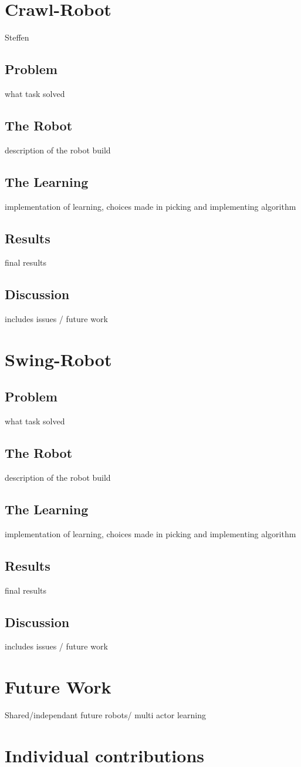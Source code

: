 \documentclass[11pt, a4paper]{article}
\begin{document}
\section{Crawl-Robot}
Steffen
\subsection{Problem}
what task solved
\subsection{The Robot}
description of the robot build
\subsection{The Learning}
implementation of learning, choices made in picking and implementing algorithm
\subsection{Results}
final results
\subsection{Discussion}
includes issues / future work

\section{Swing-Robot}

\subsection{Problem}
what task solved
\subsection{The Robot}
description of the robot build
\subsection{The Learning}
implementation of learning, choices made in picking and implementing algorithm
\subsection{Results}
final results
\subsection{Discussion}
includes issues / future work

\section{Future Work}
Shared/independant
future robots/  multi actor learning

\section{Individual contributions}




\end{document}
